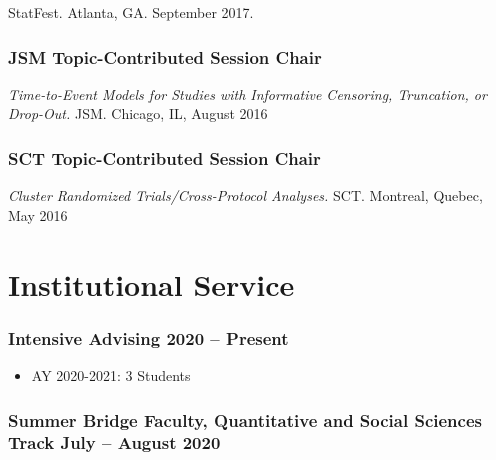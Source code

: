 \documentclass[
  fleqn, oneside]{article}
\providecommand{\tightlist}{%
  \setlength{\itemsep}{0pt}\setlength{\parskip}{0pt}}
\begin{document}
StatFest. Atlanta, GA. September 2017.

\hypertarget{jsm-topic-contributed-session-chair-2016}{%
\subsubsection{\texorpdfstring{JSM Topic-Contributed Session Chair
\hfill{}}{JSM Topic-Contributed Session Chair 2016}}\label{jsm-topic-contributed-session-chair-2016}}

\emph{Time-to-Event Models for Studies with Informative Censoring,
Truncation, or Drop-Out.} JSM. Chicago, IL, August 2016

\hypertarget{sct-topic-contributed-session-chair-2016}{%
\subsubsection{\texorpdfstring{SCT Topic-Contributed Session Chair
\hfill{}}{SCT Topic-Contributed Session Chair 2016}}\label{sct-topic-contributed-session-chair-2016}}

\emph{Cluster Randomized Trials/Cross-Protocol Analyses.} SCT. Montreal,
Quebec, May 2016

\hypertarget{institutional-service}{%
\section{Institutional Service}\label{institutional-service}}

\hypertarget{intensive-advising-2020-present}{%
\subsubsection{\texorpdfstring{Intensive Advising \hfill 2020 --
Present}{Intensive Advising 2020 -- Present}}\label{intensive-advising-2020-present}}

\begin{itemize}
\tightlist
\item
  AY 2020-2021: 3 Students 
\end{itemize}

\hypertarget{summer-bridge-faculty-quantitative-and-social-sciences-track-july-august-2020}{%
\subsubsection{\texorpdfstring{Summer Bridge Faculty, Quantitative and
Social Sciences Track \hfill\normalfont July -- August
2020}{Summer Bridge Faculty, Quantitative and Social Sciences Track July -- August 2020}}\label{summer-bridge-faculty-quantitative-and-social-sciences-track-july-august-2020}}
\end{document}
